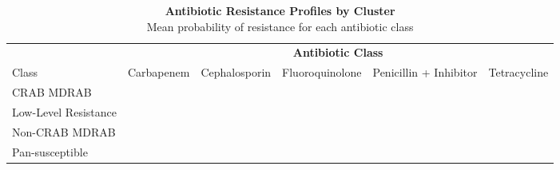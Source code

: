 \begin{table}[t]
\caption*{
{\large \textbf{Antibiotic Resistance Profiles by Cluster}} \\ 
{\small Mean probability of resistance for each antibiotic class}
} 
\fontsize{12.0pt}{14.4pt}\selectfont
\begin{tabular*}{\linewidth}{@{\extracolsep{\fill}}lrrrrr}
\toprule
 & \multicolumn{5}{c}{\textbf{Antibiotic Class}} \\ 
\cmidrule(lr){2-6}
Class & Carbapenem & Cephalosporin & Fluoroquinolone & Penicillin + Inhibitor & Tetracycline \\ 
\midrule\addlinespace[2.5pt]
CRAB MDRAB & {\cellcolor[HTML]{D83328}{\textcolor[HTML]{FFFFFF}{99.6\%}}} & {\cellcolor[HTML]{E1553A}{\textcolor[HTML]{FFFFFF}{93.1\%}}} & {\cellcolor[HTML]{E1563B}{\textcolor[HTML]{FFFFFF}{92.9\%}}} & {\cellcolor[HTML]{EA754F}{\textcolor[HTML]{FFFFFF}{85.7\%}}} & {\cellcolor[HTML]{7690B8}{\textcolor[HTML]{FFFFFF}{10.6\%}}} \\ 
Low-Level Resistance & {\cellcolor[HTML]{B3BDBC}{\textcolor[HTML]{000000}{27.1\%}}} & {\cellcolor[HTML]{ADB9BC}{\textcolor[HTML]{000000}{25.7\%}}} & {\cellcolor[HTML]{F1F2BF}{\textcolor[HTML]{000000}{45.8\%}}} & {\cellcolor[HTML]{A1AFBB}{\textcolor[HTML]{000000}{22.0\%}}} & {\cellcolor[HTML]{587EB5}{\textcolor[HTML]{FFFFFF}{3.6\%}}} \\ 
Non-CRAB MDRAB & {\cellcolor[HTML]{5F82B6}{\textcolor[HTML]{FFFFFF}{5.2\%}}} & {\cellcolor[HTML]{EA754E}{\textcolor[HTML]{FFFFFF}{85.9\%}}} & {\cellcolor[HTML]{E86D49}{\textcolor[HTML]{FFFFFF}{87.7\%}}} & {\cellcolor[HTML]{E3E6BE}{\textcolor[HTML]{000000}{41.5\%}}} & {\cellcolor[HTML]{6C8AB7}{\textcolor[HTML]{FFFFFF}{8.2\%}}} \\ 
Pan-susceptible & {\cellcolor[HTML]{4575B4}{\textcolor[HTML]{FFFFFF}{0.1\%}}} & {\cellcolor[HTML]{4876B4}{\textcolor[HTML]{FFFFFF}{0.5\%}}} & {\cellcolor[HTML]{4B78B4}{\textcolor[HTML]{FFFFFF}{1.1\%}}} & {\cellcolor[HTML]{4876B4}{\textcolor[HTML]{FFFFFF}{0.4\%}}} & {\cellcolor[HTML]{4977B4}{\textcolor[HTML]{FFFFFF}{0.8\%}}} \\ 
\bottomrule
\end{tabular*}
\end{table}

